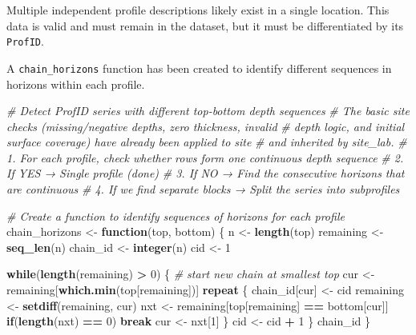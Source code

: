 \documentclass[
  10pt,
  b5paper,
  oneside]{book}
\newenvironment{Shaded}{\begin{snugshade}}{\end{snugshade}}
\newcommand{\CommentTok}[1]{\textcolor[rgb]{0.56,0.35,0.01}{\textit{#1}}}
\newcommand{\ControlFlowTok}[1]{\textcolor[rgb]{0.13,0.29,0.53}{\textbf{#1}}}
\newcommand{\DecValTok}[1]{\textcolor[rgb]{0.00,0.00,0.81}{#1}}
\newcommand{\FunctionTok}[1]{\textcolor[rgb]{0.13,0.29,0.53}{\textbf{#1}}}
\newcommand{\NormalTok}[1]{#1}
\newcommand{\OtherTok}[1]{\textcolor[rgb]{0.56,0.35,0.01}{#1}}
\newcommand{\SpecialCharTok}[1]{\textcolor[rgb]{0.81,0.36,0.00}{\textbf{#1}}}
\begin{document}
Multiple independent profile descriptions likely exist in a single location. This data is valid and must remain in the dataset, but it must be differentiated by its \texttt{ProfID}.

A \texttt{chain\_horizons} function has been created to identify different sequences in horizons within each profile.

\begin{Shaded}
\begin{Highlighting}[]
\CommentTok{\# Detect ProfID series with different top{-}bottom depth sequences}
\CommentTok{\# The basic site checks (missing/negative depths, zero thickness, invalid}
\CommentTok{\# depth logic, and initial surface coverage) have already been applied to \textasciigrave{}site\textasciigrave{}}
\CommentTok{\# and inherited by \textasciigrave{}site\_lab\textasciigrave{}.}
\CommentTok{\# 1. For each profile, check whether rows form one continuous depth sequence}
\CommentTok{\# 2. If YES → Single profile (done)}
\CommentTok{\# 3. If NO → Find the consecutive horizons that are continuous}
\CommentTok{\# 4. If we find separate blocks → Split the series into subprofiles}

\CommentTok{\# Create a function to identify sequences of horizons for each profile}
\NormalTok{chain\_horizons }\OtherTok{\textless{}{-}} \ControlFlowTok{function}\NormalTok{(top, bottom) \{}
\NormalTok{  n }\OtherTok{\textless{}{-}} \FunctionTok{length}\NormalTok{(top)}
\NormalTok{  remaining }\OtherTok{\textless{}{-}} \FunctionTok{seq\_len}\NormalTok{(n)}
\NormalTok{  chain\_id }\OtherTok{\textless{}{-}} \FunctionTok{integer}\NormalTok{(n)}
\NormalTok{  cid }\OtherTok{\textless{}{-}} \DecValTok{1}
  
  \ControlFlowTok{while}\NormalTok{(}\FunctionTok{length}\NormalTok{(remaining) }\SpecialCharTok{\textgreater{}} \DecValTok{0}\NormalTok{) \{}
    \CommentTok{\# start new chain at smallest top}
\NormalTok{    cur }\OtherTok{\textless{}{-}}\NormalTok{ remaining[}\FunctionTok{which.min}\NormalTok{(top[remaining])]}
    \ControlFlowTok{repeat}\NormalTok{ \{}
\NormalTok{      chain\_id[cur] }\OtherTok{\textless{}{-}}\NormalTok{ cid}
\NormalTok{      remaining }\OtherTok{\textless{}{-}} \FunctionTok{setdiff}\NormalTok{(remaining, cur)}
\NormalTok{      nxt }\OtherTok{\textless{}{-}}\NormalTok{ remaining[top[remaining] }\SpecialCharTok{==}\NormalTok{ bottom[cur]]}
      \ControlFlowTok{if}\NormalTok{(}\FunctionTok{length}\NormalTok{(nxt) }\SpecialCharTok{==} \DecValTok{0}\NormalTok{) }\ControlFlowTok{break}
\NormalTok{      cur }\OtherTok{\textless{}{-}}\NormalTok{ nxt[}\DecValTok{1}\NormalTok{]}
\NormalTok{    \}}
\NormalTok{    cid }\OtherTok{\textless{}{-}}\NormalTok{ cid }\SpecialCharTok{+} \DecValTok{1}
\NormalTok{  \}}
\NormalTok{  chain\_id}
\NormalTok{\}}


\end{Highlighting}
\end{Shaded}
\end{document}
